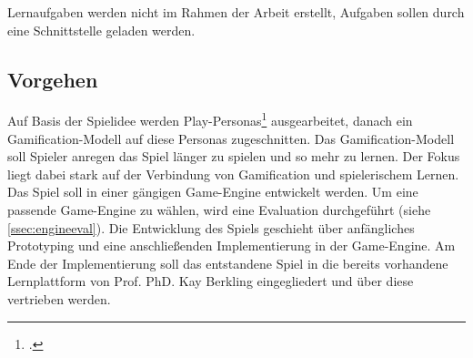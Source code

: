 	Lernaufgaben werden nicht im Rahmen der Arbeit erstellt, Aufgaben sollen durch eine Schnittstelle geladen werden.

\subsection{Vorgehen}
	Auf Basis der Spielidee werden Play-Personas\footcite{persona} ausgearbeitet, danach ein Gamification-Modell auf diese Personas zugeschnitten. Das Gamification-Modell soll Spieler anregen das Spiel länger zu spielen und so mehr zu lernen. Der Fokus liegt dabei stark auf der Verbindung von Gamification und spielerischem Lernen.
	Das Spiel soll in einer gängigen Game-Engine entwickelt werden. Um eine passende Game-Engine zu wählen, wird eine Evaluation durchgeführt (siehe \ref{ssec:engineeval}).
	Die Entwicklung des Spiels geschieht über anfängliches Prototyping und eine anschließenden Implementierung in der Game-Engine. Am Ende der Implementierung soll das entstandene Spiel in die bereits vorhandene Lernplattform von Prof. PhD. Kay Berkling eingegliedert und über diese vertrieben werden.
